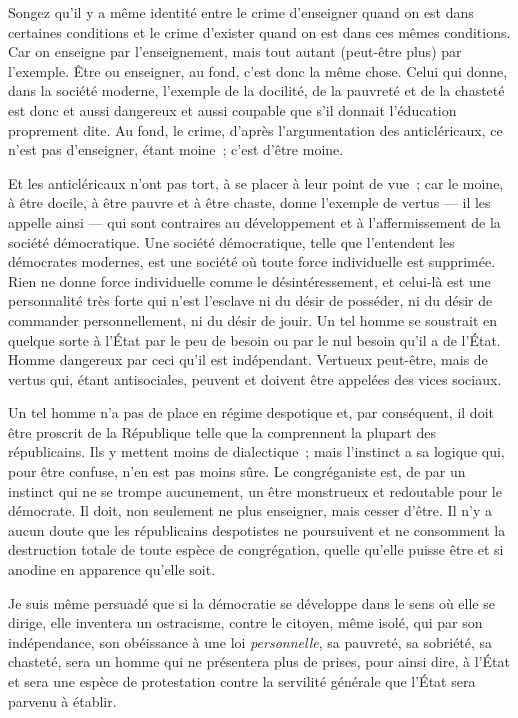 \documentclass[french,twoside]{book} %
\begin{document}
Songez qu’il y a même identité entre le crime d’enseigner quand on est dans certaines conditions et le crime d’exister quand on est dans ces mêmes conditions. Car on enseigne par l’enseignement, mais tout autant (peut-être plus) par l’exemple. Être ou enseigner, au fond, c’est donc la même chose. Celui qui donne, dans la société moderne, l’exemple de la docilité, de la pauvreté et de la chasteté est donc et aussi dangereux et aussi coupable que s’il donnait l’éducation proprement dite. Au fond, le crime, d’après l’argumentation des anticléricaux, ce n’est pas d’enseigner, étant moine ; c’est d’être moine.\par
Et les anticléricaux n’ont pas tort, à se placer à leur point de vue ; car le moine, à être docile, à être pauvre et à être chaste, donne l’exemple de vertus — il les appelle ainsi — qui sont contraires au développement et à l’affermissement de la société démocratique. Une société démocratique, telle que l’entendent les démocrates modernes, est une société où toute force individuelle est supprimée. Rien ne donne force individuelle comme le désintéressement, et  celui-là est une personnalité très forte qui n’est l’esclave ni du désir de posséder, ni du désir de commander personnellement, ni du désir de jouir. Un tel homme se soustrait en quelque sorte à l’État par le peu de besoin ou par le nul besoin qu’il a de l’État. Homme dangereux par ceci qu’il est indépendant. Vertueux peut-être, mais de vertus qui, étant antisociales, peuvent et doivent être appelées des vices sociaux.\par
Un tel homme n’a pas de place en régime despotique et, par conséquent, il doit être proscrit de la République telle que la comprennent la plupart des républicains. Ils y mettent moins de dialectique ; mais l’instinct a sa logique qui, pour être confuse, n’en est pas moins sûre. Le congréganiste est, de par un instinct qui ne se trompe aucunement, un être monstrueux et redoutable pour le démocrate. Il doit, non seulement ne plus enseigner, mais cesser d’être. Il n’y a aucun doute que les républicains despotistes ne poursuivent et ne consomment la destruction totale de toute espèce de congrégation, quelle qu’elle puisse être et si anodine en apparence qu’elle soit.\par
Je suis même persuadé que si la démocratie se développe dans le sens où elle se dirige, elle inventera un ostracisme, contre le citoyen, même isolé,  qui par son indépendance, son obéissance à une loi {\itshape personnelle}, sa pauvreté, sa sobriété, sa chasteté, sera un homme qui ne présentera plus de prises, pour ainsi dire, à l’État et sera une espèce de protestation contre la servilité générale que l’État sera parvenu à établir.\par
\end{document}

